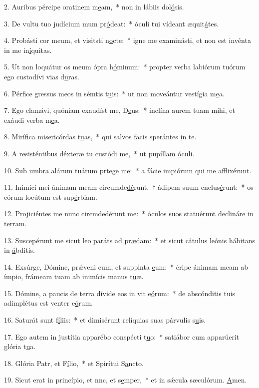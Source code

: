 2. Auribus pércipe oratinem m\uline{e}am,~* non in lábiis dol\uline{ó}sis.\par 
3. De vultu tuo judícium mum pr\uline{ó}deat:~* óculi tui vídeant æquit\uline{á}tes.\par 
4. Probásti cor meum, et visitsti n\uline{o}cte:~* igne me examinásti, et non est invénta in me in\uline{í}quitas.\par 
5. Ut non loquátur os meum ópra h\uline{ó}minum:~* propter verba labiórum tuórum ego custodívi vias d\uline{u}ras.\par 
6. Pérfice gressus meos in sémtis t\uline{u}is:~* ut non moveántur vestígia m\uline{e}a.\par 
7. Ego clamávi, quóniam exaudíst me, D\uline{e}us:~* inclína aurem tuam mihi, et exáudi verba m\uline{e}a.\par 
8. Mirífica misericórdas t\uline{u}as,~* qui salvos facis sperántes \uline{i}n te.\par 
9. A resisténtibus déxteræ tu cust\uline{ó}di me,~* ut pupíllam \uline{ó}culi.\par 
10. Sub umbra alárum tuárum prteg\uline{e} me:~* a fácie impiórum qui me afflix\uline{é}runt.\par 
11. Inimíci mei ánimam meam circumde\uline{dé}runt,~† ádipem suum cnclus\uline{é}runt:~* os eórum locútum est sup\uline{é}rbiam.\par 
12. Projiciéntes me nunc circmded\uline{é}runt me:~* óculos suos statuérunt declináre in t\uline{e}rram.\par 
13. Suscepérunt me sicut leo paráts ad pr\uline{æ}dam:~* et sicut cátulus leónis hábitans in \uline{á}bditis.\par 
14. Exsúrge, Dómine, prǽveni eum, et supplnta \uline{e}um:~* éripe ánimam meam ab ímpio, frámeam tuam ab inimícis manus t\uline{u}æ.\par 
15. Dómine, a paucis de terra dívide eos in vit e\uline{ó}rum:~* de abscónditis tuis adimplétus est venter e\uline{ó}rum.\par 
16. Saturát sunt f\uline{í}liis:~* et dimisérunt relíquias suas párvulis s\uline{u}is.\par 
17. Ego autem in justítia apparébo conspécti t\uline{u}o:~* satiábor cum apparúerit glória t\uline{u}a.\par 
18. Glória Patr, et F\uline{í}lio,~* et Spirítui S\uline{a}ncto.\par 
19. Sicut erat in princípio, et nnc, et s\uline{e}mper,~* et in sǽcula sæculórum. \uline{A}men.\par 
